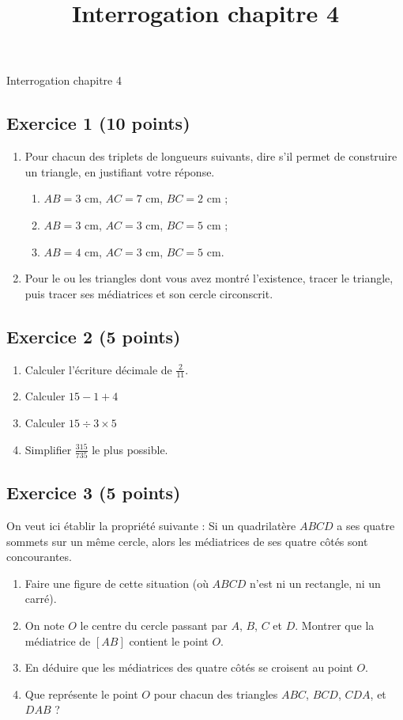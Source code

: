 \documentclass[14 pt]{extarticle}
\title{Interrogation chapitre 4}
\date{}
\theoremstyle{plain}
\begin{document}
\begin{center}{\Large Interrogation chapitre 4}\\ 
 \end{center}
 
 
 \subsection*{Exercice 1 (10 points)}
 
\begin{enumerate} 
\item Pour chacun des triplets de longueurs suivants, dire s'il permet de construire un triangle, en justifiant votre réponse.
\begin{enumerate}
\item $AB = 3$ cm, $AC = 7$ cm, $BC = 2$ cm ;
\item $AB = 3$ cm, $AC = 3$ cm, $BC = 5$ cm ;
\item $AB = 4$ cm, $AC = 3$ cm, $BC = 5$ cm. 
\end{enumerate}

\item Pour le ou les triangles dont vous avez montré l'existence, tracer le triangle, puis tracer ses médiatrices et son cercle circonscrit. 
\end{enumerate}


\subsection*{Exercice 2 (5 points)}
\begin{enumerate}
\item Calculer l'écriture décimale de $\frac2{11}$. 
\item Calculer $15 - 1 +4$
\item Calculer $15 \div 3\times 5$
\item Simplifier $\frac{315}{735}$ le plus possible. 
\end{enumerate}


\subsection*{Exercice 3 (5 points)}
On veut ici établir la propriété suivante : \og Si un quadrilatère $ABCD$ a ses quatre sommets sur un même cercle, alors les médiatrices de ses quatre côtés sont concourantes.\fg
\begin{enumerate}
\item Faire une figure de cette situation (où $ABCD$ n'est ni un rectangle, ni un carré).
\item On note $O$ le centre du cercle passant par $A$, $B$, $C$ et $D$. Montrer que la médiatrice de $[AB]$ contient le point $O$. 
\item En déduire que les médiatrices des quatre côtés se croisent au point $O$. 
\item Que représente le point $O$ pour chacun des triangles $ABC$, $BCD$, $CDA$, et $DAB$ ?
\end{enumerate}
\end{document}
